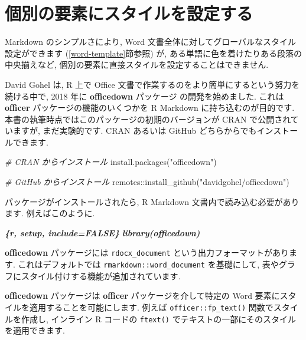 \documentclass[
  11pt,
  lualatex,
  ja=standard]{bxjsreport}
\newenvironment{Shaded}{\begin{snugshade}}{\end{snugshade}}
\newcommand{\CommentTok}[1]{\textcolor[rgb]{0.56,0.35,0.01}{\textit{#1}}}
\newcommand{\FunctionTok}[1]{\textcolor[rgb]{0.00,0.00,0.00}{#1}}
\newcommand{\InformationTok}[1]{\textcolor[rgb]{0.56,0.35,0.01}{\textbf{\textit{#1}}}}
\newcommand{\NormalTok}[1]{#1}
\newcommand{\SpecialCharTok}[1]{\textcolor[rgb]{0.00,0.00,0.00}{#1}}
\newcommand{\StringTok}[1]{\textcolor[rgb]{0.31,0.60,0.02}{#1}}
\begin{document}
\hypertarget{word-officedown}{%
\section{個別の要素にスタイルを設定する}\label{word-officedown}}

Markdown のシンプルさにより, Word 文書全体に対してグローバルなスタイル設定ができます (\ref{word-template}節参照) が, ある単語に色を着けたりある段落の中央揃えなど, 個別の要素に直接スタイルを設定することはできません.

David Gohel は, R 上で Office 文書で作業するのをより簡単にするという努力を続ける中で, 2018 年に \textbf{officedown} パッケージ \autocite{R-officedown}の開発を始めました. これは \textbf{officer} \autocite{R-officer} パッケージの機能のいくつかを R Markdown に持ち込むのが目的です. 本書の執筆時点ではこのパッケージの初期のバージョンが CRAN で公開されていますが, まだ実験的です. CRAN あるいは GitHub どちらからでもインストールできます.

\begin{Shaded}
\begin{Highlighting}[]
\CommentTok{\# CRAN からインストール}
\FunctionTok{install.packages}\NormalTok{(}\StringTok{"officedown"}\NormalTok{)}

\CommentTok{\# GitHub からインストール}
\NormalTok{remotes}\SpecialCharTok{::}\FunctionTok{install\_github}\NormalTok{(}\StringTok{"davidgohel/officedown"}\NormalTok{)}
\end{Highlighting}
\end{Shaded}

パッケージがインストールされたら, R Markdown 文書内で読み込む必要があります. 例えばこのように.

\begin{Shaded}
\begin{Highlighting}[]
\InformationTok{\textasciigrave{}\textasciigrave{}\textasciigrave{}\{r, setup, include=FALSE\}}
\InformationTok{library(officedown)}
\InformationTok{\textasciigrave{}\textasciigrave{}\textasciigrave{}}
\end{Highlighting}
\end{Shaded}

\textbf{officedown} パッケージには \texttt{rdocx\_document} という出力フォーマットがあります. これはデフォルトでは \texttt{rmarkdown::word\_document} を基礎にして, 表やグラフにスタイル付けする機能が追加されています.

\textbf{officedown} パッケージは \textbf{officer} パッケージを介して特定の Word 要素にスタイルを適用することを可能にします. 例えば \texttt{officer::fp\_text()} 関数でスタイルを作成し, インライン R コードの \texttt{ftext()} でテキストの一部にそのスタイルを適用できます.
\end{document}
